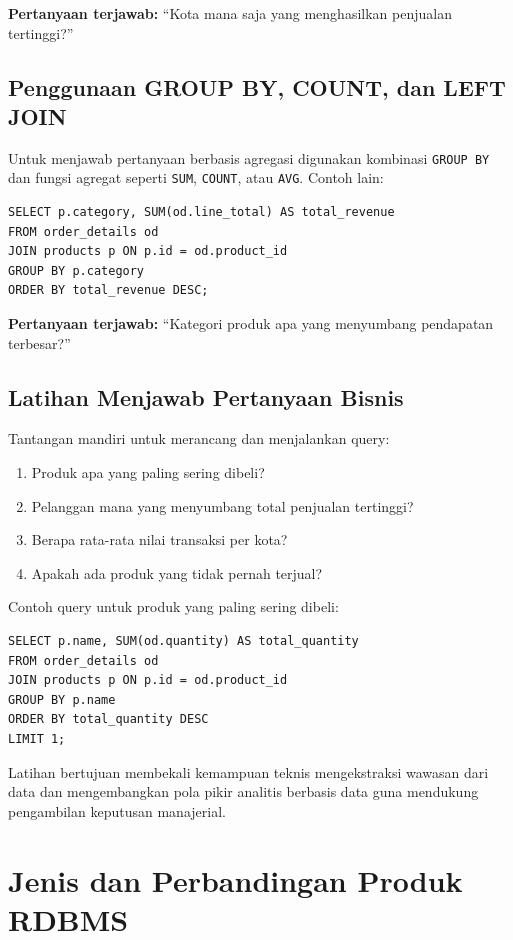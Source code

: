 \textbf{Pertanyaan terjawab:} “Kota mana saja yang menghasilkan penjualan tertinggi?”

\subsection{Penggunaan GROUP BY, COUNT, dan LEFT JOIN}

Untuk menjawab pertanyaan berbasis agregasi digunakan kombinasi \texttt{GROUP BY} dan fungsi agregat seperti \texttt{SUM}, \texttt{COUNT}, atau \texttt{AVG}. Contoh lain:

\begin{lstlisting}[style=SqlStyle]
SELECT p.category, SUM(od.line_total) AS total_revenue
FROM order_details od
JOIN products p ON p.id = od.product_id
GROUP BY p.category
ORDER BY total_revenue DESC;
\end{lstlisting}

\textbf{Pertanyaan terjawab:} “Kategori produk apa yang menyumbang pendapatan terbesar?”

\subsection{Latihan Menjawab Pertanyaan Bisnis}

Tantangan mandiri untuk merancang dan menjalankan query:

\begin{enumerate}
\item Produk apa yang paling sering dibeli?
\item Pelanggan mana yang menyumbang total penjualan tertinggi?
\item Berapa rata-rata nilai transaksi per kota?
\item Apakah ada produk yang tidak pernah terjual?
\end{enumerate}

Contoh query untuk produk yang paling sering dibeli:

\begin{lstlisting}[style=SqlStyle]
SELECT p.name, SUM(od.quantity) AS total_quantity
FROM order_details od
JOIN products p ON p.id = od.product_id
GROUP BY p.name
ORDER BY total_quantity DESC
LIMIT 1;
\end{lstlisting}

Latihan bertujuan membekali kemampuan teknis mengekstraksi wawasan dari data dan mengembangkan pola pikir analitis berbasis data guna mendukung pengambilan keputusan manajerial.

\section{Jenis dan Perbandingan Produk RDBMS}

